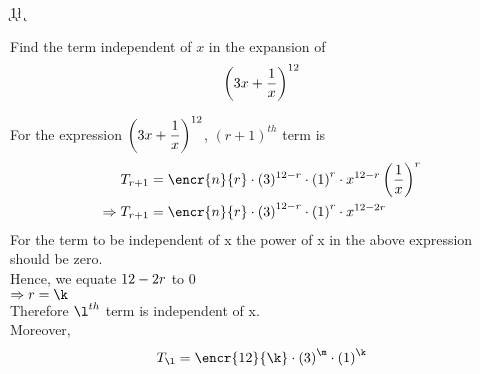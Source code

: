 


\DIVIDE{}\k 
\ADD\k{1}\l
\SUBTRACT\vbthree\k\m

\question[4] Find the term independent of $x$ in the expansion of 
 \[\left({3 x + \dfrac{1}{x}}\right)^{12}\]

\watchout

\begin{solution}[\halfpage]
For the expression $\left(3 x + \dfrac{1}{x}\right)^{12}$, $(r+1)^{th}$ term is 
	\begin{align}
	T_{r+1} &= \encr{n}{r} \cdot (\vbone)^{\vbthree - r}\cdot \left( \vbtwo \right)^{r} \cdot {x}^{\vbthree - r}  \left(\dfrac{1}{x}\right)^{r}\\
	\Rightarrow T_{r+1} &= \encr{n}{r} \cdot \left( \vbone \right)^{\vbthree - r}\cdot \left( \vbtwo \right)^{r} \cdot {x}^{\vbthree - 2r} \\
	\end{align}
For the term to be independent of x the power of x in the above expression should be zero.\\
Hence, we equate $12 - 2r$ to $0$\\
$\Rightarrow r = \k $\\
Therefore ${\l}^{th}$ term is independent of x.\\
Moreover, 
	\begin{align}
	{T}_{\l} = \encr{\vbthree}{\k} \cdot \left( \vbone \right)^{\m}\cdot \left( \vbtwo \right)^{\k}
	 \end{align}
\end{solution}


